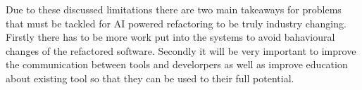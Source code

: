 Due to these discussed limitations there are two main takeaways for problems that must be tackled for AI powered refactoring to be truly industry changing.
Firstly there has to be more work put into the systems to avoid bahavioural changes of the refactored software. 
Secondly it will be very important to improve the communication between tools and develorpers as well as improve education about existing tool so that they can be used to their full potential.